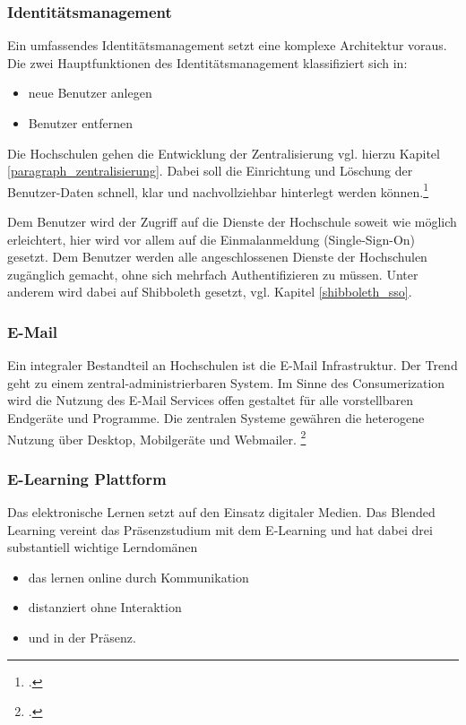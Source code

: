 \subsubsection{Identitätsmanagement}
\label{subsubsection_identitatsmanagement}
Ein umfassendes Identitätsmanagement setzt eine komplexe Architektur voraus. Die zwei Hauptfunktionen des Identitätsmanagement klassifiziert sich in:

\begin{itemize}
	\item neue Benutzer anlegen
	\item Benutzer entfernen
\end{itemize}

Die Hochschulen gehen die Entwicklung der Zentralisierung vgl. hierzu Kapitel 
\ref{paragraph_zentralisierung}. Dabei soll die Einrichtung und Löschung der Benutzer-Daten schnell, klar 
und nachvollziehbar hinterlegt werden 
können.\footcite{harnisch_identitat_2008}

Dem Benutzer wird der Zugriff auf die Dienste der Hochschule soweit wie möglich erleichtert, hier wird vor allem auf die Einmalanmeldung (Single-Sign-On) gesetzt. Dem Benutzer werden alle angeschlossenen Dienste der Hochschulen zugänglich gemacht, ohne sich mehrfach Authentifizieren zu müssen. Unter anderem wird dabei auf Shibboleth gesetzt, vgl. Kapitel \ref{shibboleth_sso}.


\subsubsection{E-Mail}
Ein integraler Bestandteil an Hochschulen ist die E-Mail Infrastruktur. Der Trend geht zu einem zentral-administrierbaren System. Im Sinne des Consumerization wird die Nutzung des E-Mail Services offen gestaltet für alle vorstellbaren Endgeräte und Programme. Die zentralen Systeme gewähren die heterogene Nutzung über Desktop, Mobilgeräte und Webmailer. \footcite{hszwickau_zahlen_2015}


\subsubsection{E-Learning Plattform}
\label{subsubsection_e_learning_plattformen}
Das elektronische Lernen setzt auf den Einsatz digitaler Medien. Das Blended Learning vereint das Präsenzstudium mit dem E-Learning und hat dabei drei substantiell wichtige Lerndomänen

\begin{itemize}
	\item das lernen online durch Kommunikation
	\item distanziert ohne Interaktion
	\item und in der Präsenz.
\end{itemize}


